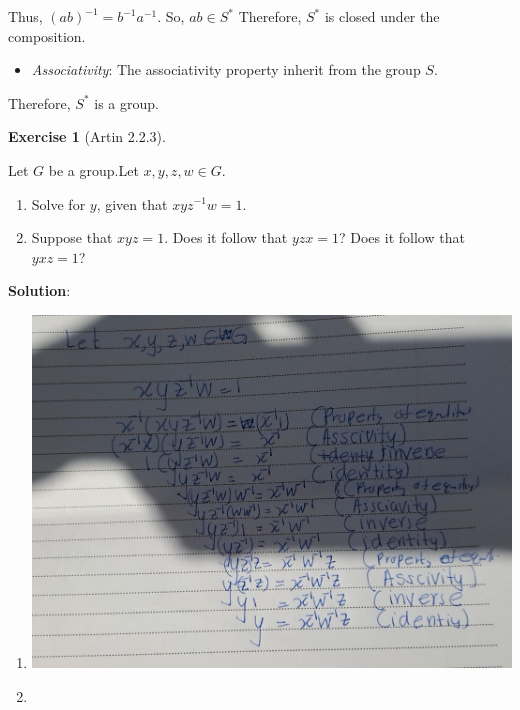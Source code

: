 \documentclass[
]{book}
\providecommand{\tightlist}{%
  \setlength{\itemsep}{0pt}\setlength{\parskip}{0pt}}
\theoremstyle{definition}
\theoremstyle{definition}
\theoremstyle{definition}
\newtheorem{exercise}{Exercise}[chapter]
\theoremstyle{definition}
\theoremstyle{remark}
\begin{document}
Thus, \((ab)^{-1}=b^{-1}a^{-1}\). So, \(ab\in S^*\)
Therefore, \(S^*\) is closed under the composition.

\begin{itemize}
\tightlist
\item
  \emph{Associativity}: The associativity property inherit from the group \(S\).
\end{itemize}

Therefore, \(S^*\) is a group.

\begin{exercise}[Artin 2.2.3]
\protect\hypertarget{exr:unnamed-chunk-86}{}\label{exr:unnamed-chunk-86}

Let \(G\) be a group.Let \(x, y, z,w \in G\).

\begin{enumerate}
\def\labelenumi{(\alph{enumi})}
\tightlist
\item
  Solve for \(y\), given that \(xyz^{-1}w = 1\).
\item
  Suppose that \(xyz = 1\). Does it follow that \(yzx = 1\)? Does it follow that \(yxz = 1\)?
\end{enumerate}

\end{exercise}

\textbf{Solution}:

\begin{enumerate}
\def\labelenumi{\alph{enumi}.}
\tightlist
\item
  \hfill\break
  \includegraphics{figures/ch_2/fig17.jpg}
\item
  \hfill\break
\end{enumerate}
\end{document}
